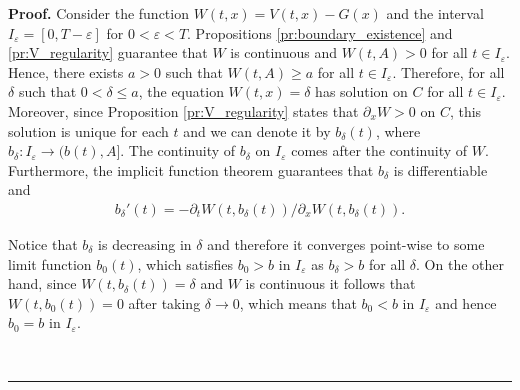 \documentclass{tufte-handout}
\newenvironment{pf}[1][Proof]{\textbf{#1.} }{\ \rule{0.5em}{0.5em}}
\begin{document}
	\begin{pf}
		Consider the function $W(t, x) = V(t, x) - G(x)$ and the interval $I_\varepsilon = [0, T - \varepsilon]$ for $0 < \varepsilon < T$. Propositions \ref{pr:boundary_existence} and \ref{pr:V_regularity} guarantee that $W$ is continuous and $W(t, A) > 0$ for all $t\in I_\varepsilon$. Hence, there exists $a > 0$ such that $W(t, A) \geq a$ for all $t\in I_\varepsilon$. Therefore, for all $\delta$ such that $0 < \delta \leq a$, the equation $W(t, x) = \delta$ has solution on $C$ for all $t\in I_\varepsilon$. Moreover, since Proposition \ref{pr:V_regularity} states that $\partial_x W > 0$ on $C$, this solution is unique for each $t$ and we can denote it by $b_\delta(t)$, where  $b_\delta:I_\varepsilon\rightarrow (b(t), A]$. The continuity of $b_\delta$ on $I_\varepsilon$ comes after the continuity of $W$. Furthermore, the implicit function theorem guarantees that $b_\delta$ is differentiable and 
		\begin{align}\label{eq:b_delta'}
		b_\delta'(t) = -\partial_t W(t, b_\delta(t)) / \partial_x W(t, b_\delta(t)).
		\end{align}
		
		Notice that $b_{\delta}$ is decreasing in $\delta$ and therefore it converges point-wise to some limit function $b_0(t)$, which satisfies $b_0 > b$ in $I_\varepsilon$ as $b_\delta > b$ for all $\delta$. On the other hand, since $W(t, b_\delta(t)) = \delta$ and $W$ is continuous it follows that $W(t, b_0(t)) = 0$ after taking $\delta\rightarrow 0$, which means that $b_0 < b$ in $I_\varepsilon$ and hence $b_0 = b$ in $I_\varepsilon$.
		

\end{pf}
\end{document}
